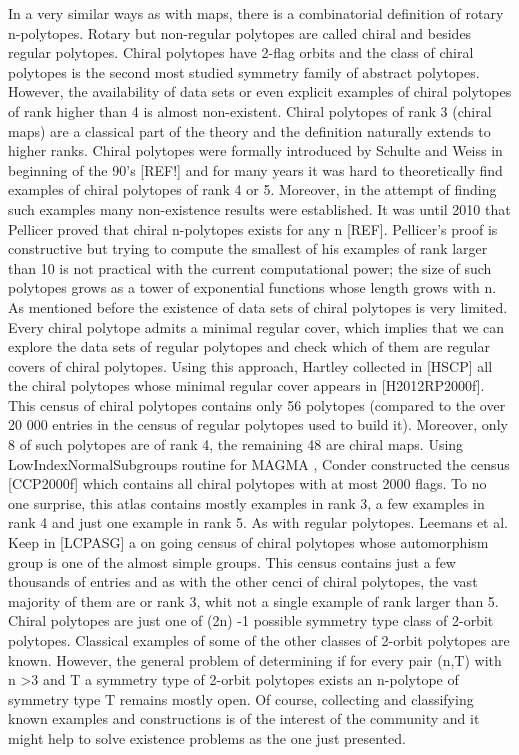 In a very similar ways as with maps, there is a combinatorial definition of rotary n-polytopes. Rotary but non-regular polytopes are called chiral and besides regular polytopes. Chiral polytopes have 2-flag orbits and the class of chiral polytopes is the second most studied symmetry family of abstract polytopes. However, the availability of data sets or even explicit examples of chiral polytopes of rank higher than 4 is almost non-existent. Chiral polytopes of rank 3 (chiral maps) are a classical part of the theory and the definition naturally extends to higher ranks. Chiral polytopes were formally introduced by Schulte and Weiss in beginning of the 90’s [REF!] and for many years it was hard to theoretically find examples of chiral polytopes of rank 4 or 5. Moreover, in the attempt of finding such examples many non-existence results were established. It was until 2010 that Pellicer proved that chiral n-polytopes exists for any n [REF]. Pellicer’s proof is constructive but trying to compute the smallest of his examples of rank larger than 10 is not practical with the current computational power; the size of such polytopes grows as a tower of exponential functions whose length grows with n.
As mentioned before the existence of data sets of chiral polytopes is very limited. Every chiral polytope admits a minimal regular cover, which implies that we can explore the data sets of regular polytopes and check which of them are regular covers of chiral polytopes. Using this approach, Hartley collected in [HSCP] all the chiral polytopes whose minimal regular cover appears in [H2012RP2000f]. This census of chiral polytopes contains only 56 polytopes (compared to the over 20 000 entries in the census of regular polytopes used to build it). Moreover, only 8 of such polytopes are of rank 4, the remaining 48 are chiral maps. Using LowIndexNormalSubgroups routine for MAGMA , Conder constructed the census [CCP2000f] which contains all chiral polytopes with at most 2000 flags. To no one surprise, this atlas contains mostly examples in rank 3, a few examples in rank 4 and just one example in rank 5. As with regular polytopes. Leemans et al. Keep in [LCPASG] a on going census of chiral polytopes whose automorphism group is one of the almost simple groups. This census contains just a few thousands of entries and as with the other cenci of chiral polytopes, the vast majority of them are or rank 3, whit not a single example of rank larger than 5.
Chiral polytopes are just one of (2n) -1 possible symmetry type class of 2-orbit polytopes. Classical examples of some of the other classes of 2-orbit polytopes are known. However, the general problem of determining if for every pair (n,T) with n >3 and T a symmetry type of 2-orbit polytopes exists an n-polytope of symmetry type T remains mostly open. Of course, collecting and classifying known examples and constructions is of the interest of the community and it might help to solve existence problems as the one just presented.
